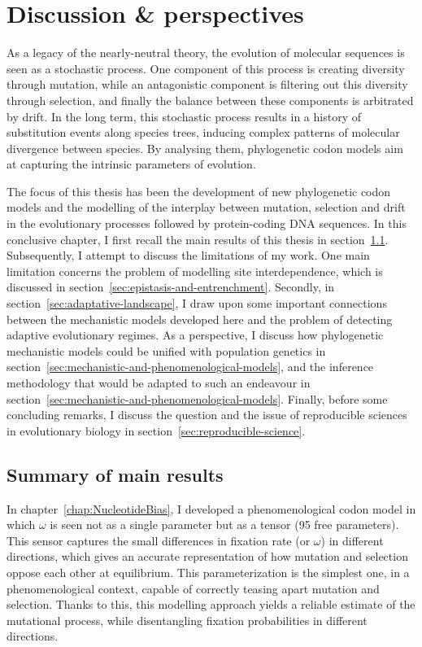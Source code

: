 \chapter{Discussion \& perspectives}
\label{ch:discussion-perspectives}
{\hypersetup{linkcolor=GREYDARK}\minitoc}

As a legacy of the \gls{nearly-neutral} theory, the evolution of molecular sequences is seen as a stochastic process.
One component of this process is creating diversity through mutation, while an antagonistic component is filtering out this diversity through selection, and finally the balance between these components is arbitrated by drift.
In the long term, this stochastic process results in a history of \gls{substitution} events along species trees, inducing complex patterns of molecular divergence between species.
By analysing them, phylogenetic \gls{codon} models aim at capturing the intrinsic parameters of evolution.

The focus of this thesis has been the development of new phylogenetic \gls{codon} models and the modelling of the interplay between mutation, selection and drift in the evolutionary processes followed by protein-coding \acrshort{DNA} sequences.
In this conclusive chapter, I first recall the main results of this thesis in section~\ref{sec:summary-of-main-results}.
Subsequently, I attempt to discuss the limitations of my work.
One main limitation concerns the problem of modelling site interdependence, which is discussed in section~\ref{sec:epistasis-and-entrenchment}.
Secondly, in section~\ref{sec:adaptative-landscape}, I draw upon some important connections between the mechanistic models developed here and the problem of detecting adaptive evolutionary regimes.
As a perspective, I discuss how phylogenetic mechanistic models could be unified with population genetics in section~\ref{sec:mechanistic-and-phenomenological-models}, and the inference methodology that would be adapted to such an endeavour in section~\ref{sec:mechanistic-and-phenomenological-models}.
Finally, before some concluding remarks, I discuss the question and the issue of reproducible sciences in evolutionary biology in section~\ref{sec:reproducible-science}.


\section{Summary of main results}
\label{sec:summary-of-main-results}

In chapter~\ref{chap:NucleotideBias}, I developed a phenomenological \gls{codon} model in which $\omega$ is seen not as a single parameter but as a tensor (95 free parameters).
This sensor captures the small differences in fixation rate (or $\omega$) in different directions, which gives an accurate representation of how mutation and selection oppose each other at equilibrium.
This parameterization is the simplest one, in a phenomenological context, capable of correctly teasing apart mutation and selection.
Thanks to this, this modelling approach yields a reliable estimate of the mutational process, while disentangling fixation probabilities in different directions.


